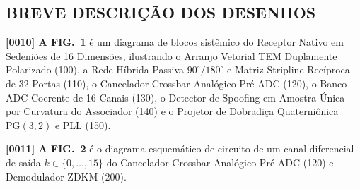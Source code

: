 \documentclass[12pt,a4paper]{article}
\begin{document}
\subsection*{BREVE DESCRI\c{C}\~AO DOS DESENHOS}
\textbf{[0010] A FIG.\ 1} \'e um diagrama de blocos sist\^emico do Receptor Nativo em Sedeni\~oes de 16 Dimens\~oes, ilustrando o Arranjo Vetorial TEM Duplamente Polarizado (100), a Rede H\'ibrida Passiva $90^\circ/180^\circ$ e Matriz Stripline Rec\'iproca de 32 Portas (110), o Cancelador Crossbar Anal\'ogico Pr\'e-ADC (120), o Banco ADC Coerente de 16 Canais (130), o Detector de Spoofing em Amostra \'Unica por Curvatura do Associador (140) e o Projetor de Dobradi\c{c}a Quaterni\^onica $\mathrm{PG}(3,2)$ e PLL (150).

\textbf{[0011] A FIG.\ 2} \'e o diagrama esquem\'atico de circuito de um canal diferencial de sa\'ida $k \in \{0,\dots,15\}$ do Cancelador Crossbar Anal\'ogico Pr\'e-ADC (120) e Demodulador ZDKM (200).
\end{document}
